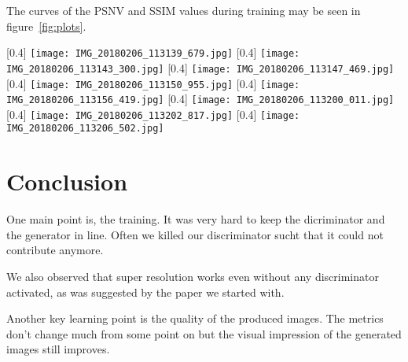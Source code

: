 \documentclass[10pt,twocolumn,letterpaper]{article}
\begin{document}
The curves of the PSNV and SSIM values during training may be seen in
figure~\ref{fig:plots}.
\begin{figure*}[h]
  \centering

  \subcaptionbox{}[0.4\linewidth]{%
    \texttt{[image: IMG\_20180206\_113139\_679.jpg]}
  }
  \subcaptionbox{}[0.4\linewidth]{%
    \texttt{[image: IMG\_20180206\_113143\_300.jpg]}
  }
  \subcaptionbox{}[0.4\linewidth]{%
    \texttt{[image: IMG\_20180206\_113147\_469.jpg]}
  }
  \subcaptionbox{}[0.4\linewidth]{%
    \texttt{[image: IMG\_20180206\_113150\_955.jpg]}
  }
  \subcaptionbox{}[0.4\linewidth]{%
    \texttt{[image: IMG\_20180206\_113156\_419.jpg]}
  }
  \subcaptionbox{}[0.4\linewidth]{%
    \texttt{[image: IMG\_20180206\_113200\_011.jpg]}
  }
  \subcaptionbox{}[0.4\linewidth]{%
    \texttt{[image: IMG\_20180206\_113202\_817.jpg]}
  }
  \subcaptionbox{}[0.4\linewidth]{%
    \texttt{[image: IMG\_20180206\_113206\_502.jpg]}
  }  
  \caption{Curves of metrics during training}
  \label{fig:plots}
\end{figure*}

\section{Conclusion}
\label{sec:conclusion}
One main point is, the training. It was very hard to keep the
dicriminator and the generator in line. Often we killed our
discriminator sucht that it could not contribute anymore.

We also observed that super resolution works even without any
discriminator activated, as was suggested by the paper we started
with.

Another key learning point is the quality of the produced images. The
metrics don't change much from some point on but the visual impression
of the generated images still improves.





\appendix

{
  \nocite{*}                      %
  \small
  
  
  
}
\end{document}

